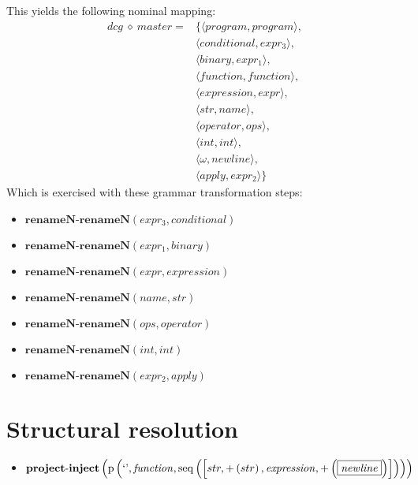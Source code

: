 This yields the following nominal mapping:
\begin{align*}\mathit{dcg} \:\diamond\: \mathit{master} =& \{\langle \mathit{program},\mathit{program}\rangle,\\
 & \langle \mathit{conditional},\mathit{expr_3}\rangle,\\
 & \langle \mathit{binary},\mathit{expr_1}\rangle,\\
 & \langle \mathit{function},\mathit{function}\rangle,\\
 & \langle \mathit{expression},\mathit{expr}\rangle,\\
 & \langle str,\mathit{name}\rangle,\\
 & \langle \mathit{operator},\mathit{ops}\rangle,\\
 & \langle int,\mathit{int}\rangle,\\
 & \langle \omega,\mathit{newline}\rangle,\\
 & \langle \mathit{apply},\mathit{expr_2}\rangle\}\end{align*}
 Which is exercised with these grammar transformation steps:

{\footnotesize\begin{itemize}
\item $\mathbf{renameN\text{-}renameN}\left(\mathit{expr_3},\mathit{conditional}\right)$
\item $\mathbf{renameN\text{-}renameN}\left(\mathit{expr_1},\mathit{binary}\right)$
\item $\mathbf{renameN\text{-}renameN}\left(\mathit{expr},\mathit{expression}\right)$
\item $\mathbf{renameN\text{-}renameN}\left(\mathit{name},str\right)$
\item $\mathbf{renameN\text{-}renameN}\left(\mathit{ops},\mathit{operator}\right)$
\item $\mathbf{renameN\text{-}renameN}\left(\mathit{int},int\right)$
\item $\mathbf{renameN\text{-}renameN}\left(\mathit{expr_2},\mathit{apply}\right)$
\end{itemize}}

\section{Structural resolution}
{\footnotesize\begin{itemize}
\item $\mathbf{project\text{-}inject}\\\left(\mathrm{p}\left(\text{`'},\mathit{function},\mathrm{seq}\left(\left[str, {+}\left(str\right), \mathit{expression}, {+}\left(\fbox{$\mathit{newline}$}\right)\right]\right)\right)\right)$
\end{itemize}}
